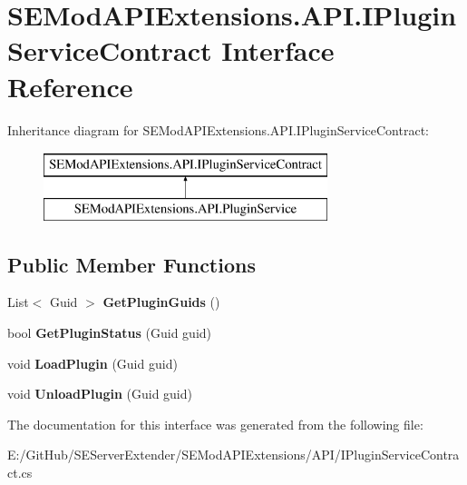 \hypertarget{interface_s_e_mod_a_p_i_extensions_1_1_a_p_i_1_1_i_plugin_service_contract}{}\section{S\+E\+Mod\+A\+P\+I\+Extensions.\+A\+P\+I.\+I\+Plugin\+Service\+Contract Interface Reference}
\label{interface_s_e_mod_a_p_i_extensions_1_1_a_p_i_1_1_i_plugin_service_contract}
Inheritance diagram for S\+E\+Mod\+A\+P\+I\+Extensions.\+A\+P\+I.\+I\+Plugin\+Service\+Contract\+:\begin{figure}[H]
\begin{center}
\leavevmode
\includegraphics[height=2.000000cm]{interface_s_e_mod_a_p_i_extensions_1_1_a_p_i_1_1_i_plugin_service_contract}
\end{center}
\end{figure}
\subsection*{Public Member Functions}
\begin{DoxyCompactItemize}
\item 
\hypertarget{interface_s_e_mod_a_p_i_extensions_1_1_a_p_i_1_1_i_plugin_service_contract_acf5a683b7268853c21e4b373c0b72c40}{}List$<$ Guid $>$ {\bfseries Get\+Plugin\+Guids} ()\label{interface_s_e_mod_a_p_i_extensions_1_1_a_p_i_1_1_i_plugin_service_contract_acf5a683b7268853c21e4b373c0b72c40}

\item 
\hypertarget{interface_s_e_mod_a_p_i_extensions_1_1_a_p_i_1_1_i_plugin_service_contract_acd9fba233e7cc1f459889503b31ac5d4}{}bool {\bfseries Get\+Plugin\+Status} (Guid guid)\label{interface_s_e_mod_a_p_i_extensions_1_1_a_p_i_1_1_i_plugin_service_contract_acd9fba233e7cc1f459889503b31ac5d4}

\item 
\hypertarget{interface_s_e_mod_a_p_i_extensions_1_1_a_p_i_1_1_i_plugin_service_contract_a516a4800de345ba64ce1f840a41d84d0}{}void {\bfseries Load\+Plugin} (Guid guid)\label{interface_s_e_mod_a_p_i_extensions_1_1_a_p_i_1_1_i_plugin_service_contract_a516a4800de345ba64ce1f840a41d84d0}

\item 
\hypertarget{interface_s_e_mod_a_p_i_extensions_1_1_a_p_i_1_1_i_plugin_service_contract_ac7ea75bfc71f9a28f688e3d77b79a958}{}void {\bfseries Unload\+Plugin} (Guid guid)\label{interface_s_e_mod_a_p_i_extensions_1_1_a_p_i_1_1_i_plugin_service_contract_ac7ea75bfc71f9a28f688e3d77b79a958}

\end{DoxyCompactItemize}


The documentation for this interface was generated from the following file\+:\begin{DoxyCompactItemize}
\item 
E\+:/\+Git\+Hub/\+S\+E\+Server\+Extender/\+S\+E\+Mod\+A\+P\+I\+Extensions/\+A\+P\+I/I\+Plugin\+Service\+Contract.\+cs\end{DoxyCompactItemize}

